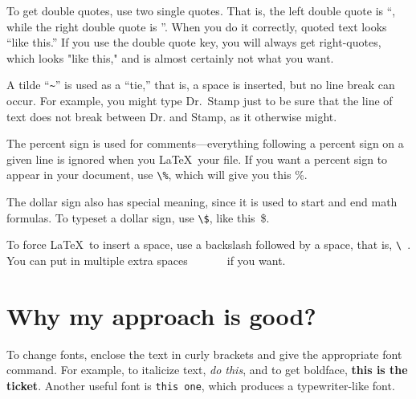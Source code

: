 To get double quotes, use two single quotes. That is, the left double quote is ``, while the right double
quote is ''. When you do it correctly, quoted text looks ``like this.''
If you use the double quote key, you will always get right-quotes, which looks "like this," and is
almost certainly not what you want.

A tilde ``\verb+~+'' is used as a ``tie,'' that is, a space is inserted, but no line break can occur.
For example, you might type Dr.~Stamp just to be sure that the line of text
does not break between Dr. and Stamp, as it otherwise might.

The percent sign is used for comments---everything following a percent sign 
on a given line is ignored when you \LaTeX\ your file. %
If you want a percent sign to appear in your document, use \verb+\%+, 
which will give you this \%.

The dollar sign also has special meaning, since it is used to start and end
math formulas. To typeset a dollar sign, use \verb+\$+, like this~\$.

To force \LaTeX\ to insert a space, use a backslash followed by
a space, that is, \verb+\ +. You can put in multiple extra spaces\ \ \ \ \ \ \ if you want.

\section{Why my approach is good?}

To change fonts, enclose the text in curly brackets and give the appropriate font command.
For example, to italicize text, {\it do this}, and to get boldface, {\bf this is the ticket}.
Another useful font is {\tt this one}, which produces a typewriter-like font.

